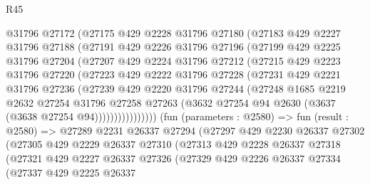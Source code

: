 \begin{lexlean}{R45}
\begin{coremodule}
              @31796
              @27172
              (@27175
                @429
                @2228
                @31796
                @27180
                (@27183
                  @429
                  @2227
                  @31796
                  @27188
                  (@27191
                    @429
                    @2226
                    @31796
                    @27196
                    (@27199
                      @429
                      @2225
                      @31796
                      @27204
                      (@27207
                        @429
                        @2224
                        @31796
                        @27212
                        (@27215
                          @429
                          @2223
                          @31796
                          @27220
                          (@27223
                            @429
                            @2222
                            @31796
                            @27228
                            (@27231
                              @429
                              @2221
                              @31796
                              @27236
                              (@27239
                                @429
                                @2220
                                @31796
                                @27244
                                (@27248
                                  @1685
                                  @2219
                                  @2632
                                  @27254
                                  @31796
                                  @27258
                                  @27263
                                  (@3632 @27254 @94 @2630 (@3637 (@3638 @27254 @94))))))))))))))))
        (fun (parameters : @2580) =>
        fun (result : @2580) =>
        @27289
          @2231
          @26337
          @27294
          (@27297
            @429
            @2230
            @26337
            @27302
            (@27305
              @429
              @2229
              @26337
              @27310
              (@27313
                @429
                @2228
                @26337
                @27318
                (@27321
                  @429
                  @2227
                  @26337
                  @27326
                  (@27329
                    @429
                    @2226
                    @26337
                    @27334
                    (@27337
                      @429
                      @2225
                      @26337

\end{coremodule}
\end{lexlean}
